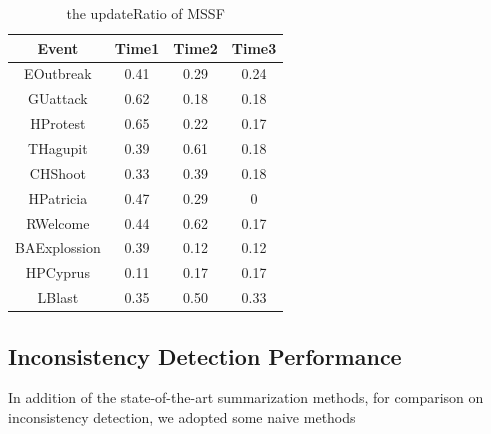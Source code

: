 \documentclass{llncs}
\begin{document}
\begin{table}[htp]\label{table:update 0f mssf}
\caption{the updateRatio of MSSF}
\begin{center}
    \begin{tabular}{|c|c|c|c|}
    \hline
    Event & Time1 & Time2 & Time3 \\
    \hline
    EOutbreak & 0.41 & 0.29 & 0.24 \\
    \hline
    GUattack & 0.62 & 0.18 & 0.18 \\
    \hline
    HProtest & 0.65 & 0.22 & 0.17 \\
    \hline
    THagupit & 0.39 & 0.61 & 0.18\\
    \hline
    CHShoot & 0.33 & 0.39 & 0.18\\
    \hline
    HPatricia & 0.47 & 0.29 & 0\\
    \hline
    RWelcome & 0.44 & 0.62 & 0.17\\
    \hline
    BAExplossion & 0.39 & 0.12 & 0.12\\
    \hline
    HPCyprus & 0.11 & 0.17 & 0.17\\
    \hline
    LBlast & 0.35 & 0.50 & 0.33\\
    \hline
    \end{tabular}
\end{center}
\label{default}
\end{table}

\subsection{Inconsistency Detection Performance}
In addition of the state-of-the-art summarization methods, for comparison on inconsistency detection, we adopted some naive methods
\end{document}

